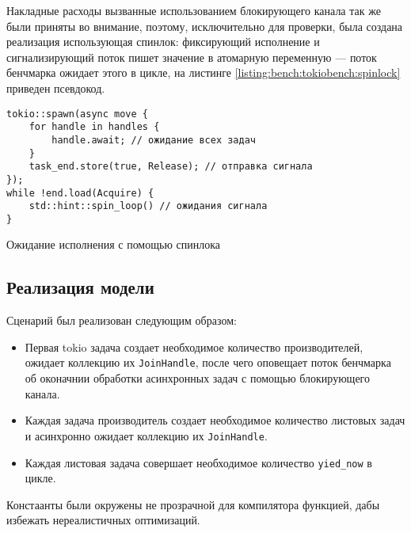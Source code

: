 Накладные расходы вызванные использованием блокирующего канала так же были приняты во внимание, поэтому, исключительно для проверки, была создана реализация использующая спинлок: фиксирующий исполнение и сигнализирующий поток пишет значение в атомарную переменную --- поток бенчмарка ожидает этого в цикле, на листинге \ref{listing:bench:tokiobench:spinlock} приведен псевдокод.

\begin{listing}[H]
    \begin{verbatim}
tokio::spawn(async move {
    for handle in handles {
        handle.await; // ожидание всех задач
    }
    task_end.store(true, Release); // отправка сигнала
});
while !end.load(Acquire) {
    std::hint::spin_loop() // ожидания сигнала
}
    \end{verbatim}
    \caption{Ожидание исполнения с помощью спинлока}
    \label{listing:bench:tokiobench:spinlock}
\end{listing}

\subsection{Реализация модели}

Сценарий был реализован следующим образом:

\begin{itemize}
    \item Первая tokio задача создает необходимое количество производителей, ожидает коллекцию их \verb|JoinHandle|, после чего оповещает поток бенчмарка об оконачнии обработки асинхронных задач с помощью блокирующего канала.
    \item Каждая задача производитель создает необходимое количество листовых задач и асинхронно ожидает коллекцию их \verb|JoinHandle|.
    \item Каждая листовая задача совершает необходимое количество \verb|yied_now| в цикле.
\end{itemize}

Констаанты были окружены не прозрачной для компилятора функцией, дабы избежать нереалистичных оптимизаций.
